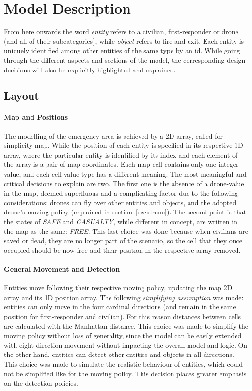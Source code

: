 
\section{Model Description}
From here onwards the word \textit{entity} refers to a civilian, first-responder or drone (and all of their subcategories), while \textit{object} refers to fire and exit. Each entity is uniquely identified among other entities of the same type by an id. While going through the different aspects and sections of the model, the corresponding design decisions will also be explicitly highlighted and explained.


\subsection{Layout}
\paragraph{Map and Positions}
\label{sec:map}
The modelling of the emergency area is achieved by a 2D array, called for simplicity map. While the position of each entity is specified in its respective 1D array, where the particular entity is identified by its index and each element of the array is a pair of map coordinates.\newline
Each map cell contains only one integer value, and each cell value type has a different meaning. The most meaningful and critical decisions to explain are two. The first one is the absence of a drone-value in the map, deemed superfluous and a complicating factor due to the following considerations: drones can fly over other entities and objects, and the adopted drone's moving policy (explained in section~\ref{sec:drone}). The second point is that the states of \textit{SAFE} and \textit{CASUALTY}, while different in concept, are written in the map as the same: \textit{FREE}. This last choice was done because when civilians are saved or dead, they are no longer part of the scenario, so the cell that they once occupied should be now free and their position in the respective array removed.
\paragraph{General Movement and Detection}
Entities move following their respective moving policy, updating the map 2D array and its 1D position array. The following \textit{simplifying assumption} was made: entities can only move in the four cardinal directions (and remain in the same position for first-responder and civilian). For this reason distances between cells are calculated with the Manhattan distance. This choice was made to simplify the moving policy without loss of generality, since the model can be easily extended with eight-direction movement without impacting the overall model and logic. On the other hand, entities can detect other entities and objects in all directions. This choice was made to simulate the realistic behaviour of entities, which could not be simplified like for the moving policy. This decision places greater emphasis on the detection policies.


